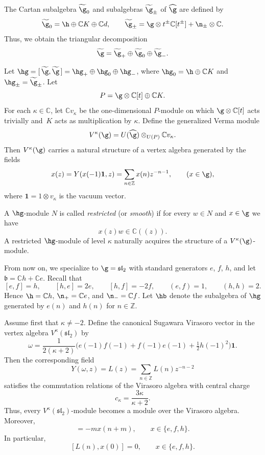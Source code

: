 \documentclass[10pt,a4paper]{amsart}
\numberwithin{equation}{section}
\theoremstyle{definition}
\let\frak\mathfrak
\newcommand{\1}{\textbf{1}}
\begin{document}
The Cartan subalgebra ${\widetilde{\g}}_0$ and subalgebras ${\widetilde{\g}}_{\pm}$ of ${\widehat{\g}}$ are defined by
\[
 {\widetilde{\g}}_0 = {\h} \oplus \mathbb{C}K \oplus \mathbb{C}d, \qquad
 {\widetilde{\g}}_{\pm} = \g \otimes t^{\pm}\mathbb{C}[t^{\pm}] + {\n}_{\pm} \otimes \mathbb{C}.
\]
Thus, we obtain the triangular decomposition
\[
 \widetilde{\g} = \widetilde{\g}_{+} \oplus \widetilde{\g}_{0} \oplus \widetilde{\g}_{-}.
\]

Let $\hg = [ \, \widetilde{\g}, \widetilde{\g} \, ] = \hg_{+} \oplus \hg_{0} \oplus \hg_{-}$,
where $\hg_{0} = {\h} \oplus \mathbb{C}K$ and $\hg_{\pm} = \widetilde{\g}_{\pm}$.
Let
\[
 P = {\g} \otimes \mathbb{C}[t] \oplus \mathbb{C}K.
\]
For each $\kappa \in \mathbb{C}$, let $\mathbb{C}v_{\kappa}$ be the one-dimensional $P$-module on which
${\g} \otimes \mathbb{C}[t]$ acts trivially and~$K$ acts as multiplication by $\kappa$.
Define the generalized Verma module
\[
 V^{\kappa}(\g) = U(\widehat{\g}) \otimes_{U(P)} \mathbb{C}v_{\kappa}.
\]
Then $V^{\kappa}(\g)$ carries a natural structure of a vertex algebra generated by the fields
\[
 x(z) = Y(x(-1)\mathbf{1}, z) = \sum_{n \in \mathbb{Z}} x(n) z^{-n-1},
 \qquad (x \in \g),
\]
where $\mathbf{1} = 1 \otimes v_{\kappa}$ is the vacuum vector.

A $\hg$-module $N$ is called \emph{restricted} (or \emph{smooth}) if for every $w \in N$ and $x \in \g$ we have
\[
 x(z) w \in \mathbb{C}((z)).
\]
A restricted $\hg$-module of level $\kappa$ naturally acquires the structure of a $V^{\kappa}(\g)$-module.

From now on, we specialize to $\g = \mathfrak{sl}_2$ with standard generators $e$, $f$, $h$,
and let ${\frak b} = \mathbb{C}h + \mathbb{C}e$.
Recall that
\[
 [e,f] = h, \qquad [h,e] = 2e, \qquad [h,f] = -2f, \qquad (e,f) = 1, \qquad (h,h) = 2.
\]
Hence $\h = \mathbb{C}h$, $\n_{+} = \mathbb{C}e$, and $\n_{-} = \mathbb{C}f$.
Let $\hb$ denote the subalgebra of $\hg$ generated by $e(n)$ and $h(n)$ for $n \in \mathbb{Z}$.

Assume first that $\kappa \neq -2$.
Define the canonical Sugawara Virasoro vector in the vertex algebra $V^{\kappa}(\mathfrak{sl}_2)$ by
\[
 \omega = \frac{1}{2(\kappa + 2)} \bigl( e(-1)f(-1) + f(-1)e(-1) + \tfrac{1}{2}h(-1)^2 \bigr)\mathbf{1}.
\]
Then the corresponding field
\[
 Y(\omega,z) = L(z) = \sum_{n \in \mathbb{Z}} L(n) z^{-n-2}
\]
satisfies the commutation relations of the Virasoro algebra with central charge
\[
 c_{\kappa} = \frac{3\kappa}{\kappa + 2}.
\]
Thus, every $V^{\kappa}(\mathfrak{sl}_2)$-module becomes a module over the Virasoro algebra.
Moreover,
\begin{equation*} %
 [L(n), x(m)] = -m x(n+m), \qquad x \in \{e,f,h\}.
\end{equation*}
In particular,
\[
 [L(n), x(0)] = 0, \qquad x \in \{e,f,h\}.
\]
\end{document}
